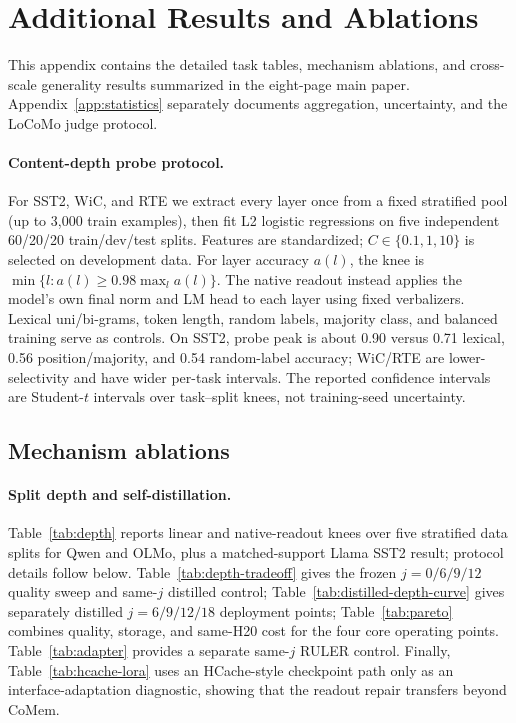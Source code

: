 \section{Additional Results and Ablations}
\label{sec:appendix}

This appendix contains the detailed task tables, mechanism ablations, and
cross-scale generality results summarized in the eight-page main paper.
Appendix~\ref{app:statistics} separately documents aggregation, uncertainty,
and the LoCoMo judge protocol.

\paragraph{Content-depth probe protocol.}
For SST2, WiC, and RTE we extract every layer once from a fixed stratified pool
(up to 3,000 train examples), then fit L2 logistic regressions on five independent
60/20/20 train/dev/test splits. Features are standardized; $C\in\{0.1,1,10\}$
is selected on development data. For layer accuracy $a(l)$, the knee is
$\min\{l:a(l)\geq0.98\max_l a(l)\}$. The native readout instead applies the
model's own final norm and LM head to each layer using fixed verbalizers. Lexical
uni/bi-grams, token length, random labels, majority class, and balanced training
serve as controls. On SST2, probe peak is about 0.90 versus 0.71 lexical, 0.56
position/majority, and 0.54 random-label accuracy; WiC/RTE are lower-selectivity
and have wider per-task intervals. The reported confidence intervals are
Student-$t$ intervals over task--split knees, not training-seed uncertainty.

\subsection{Mechanism ablations}
\label{app:ablations}

\paragraph{Split depth and self-distillation.}
Table~\ref{tab:depth} reports linear and native-readout knees over five
stratified data splits for Qwen and OLMo, plus a matched-support Llama SST2
result; protocol details follow below. Table~\ref{tab:depth-tradeoff}
gives the frozen $j=0/6/9/12$ quality sweep and same-$j$ distilled control;
Table~\ref{tab:distilled-depth-curve} gives separately distilled
$j=6/9/12/18$ deployment points; Table~\ref{tab:pareto} combines quality,
storage, and same-H20 cost for the four
core operating points. Table~\ref{tab:adapter} provides a separate same-$j$
RULER control.
Finally, Table~\ref{tab:hcache-lora} uses an HCache-style checkpoint path only
as an interface-adaptation diagnostic, showing that the readout repair transfers
beyond CoMem.

